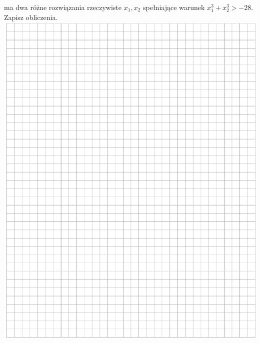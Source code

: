 \documentclass[10pt]{article}
\begin{document}
ma dwa różne rozwiązania rzeczywiste \(x_{1}, x_{2}\) spełniające warunek \(x_{1}^{3}+x_{2}^{3}>-28\). Zapisz obliczenia.\\
\includegraphics[max width=\textwidth, center]{2024_11_21_f1ecc00f5c4ab21f0d04g-18}\\
\end{document}
